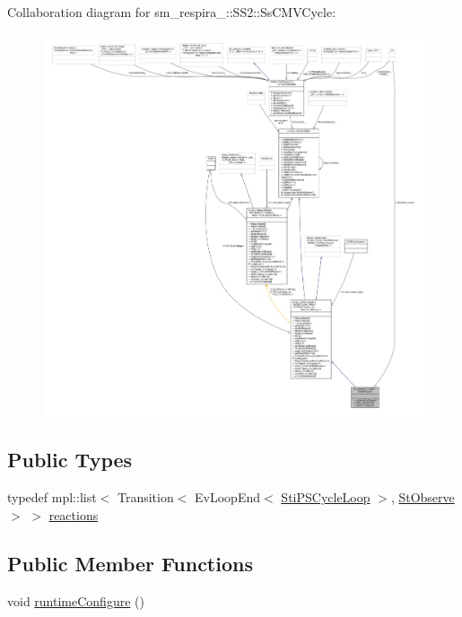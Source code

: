 Collaboration diagram for sm\+\_\+respira\+\_\+:\+:S\+S2\+:\+:Ss\+C\+M\+V\+Cycle\+:
\nopagebreak
\begin{figure}[H]
\begin{center}
\leavevmode
\includegraphics[width=350pt]{structsm__respira__1_1_1SS2_1_1SsCMVCycle__coll__graph}
\end{center}
\end{figure}
\subsection*{Public Types}
\begin{DoxyCompactItemize}
\item 
typedef mpl\+::list$<$ Transition$<$ Ev\+Loop\+End$<$ \hyperlink{structsm__respira__1_1_1cmv__cycle__inner__states_1_1StiPSCycleLoop}{Sti\+P\+S\+Cycle\+Loop} $>$, \hyperlink{structsm__respira__1_1_1StObserve}{St\+Observe} $>$ $>$ \hyperlink{structsm__respira__1_1_1SS2_1_1SsCMVCycle_a95e2f9a21c894a79b29b1179120c3d52}{reactions}
\end{DoxyCompactItemize}
\subsection*{Public Member Functions}
\begin{DoxyCompactItemize}
\item 
void \hyperlink{structsm__respira__1_1_1SS2_1_1SsCMVCycle_a13a30a0da000080de97da790285d370c}{runtime\+Configure} ()
\end{DoxyCompactItemize}
